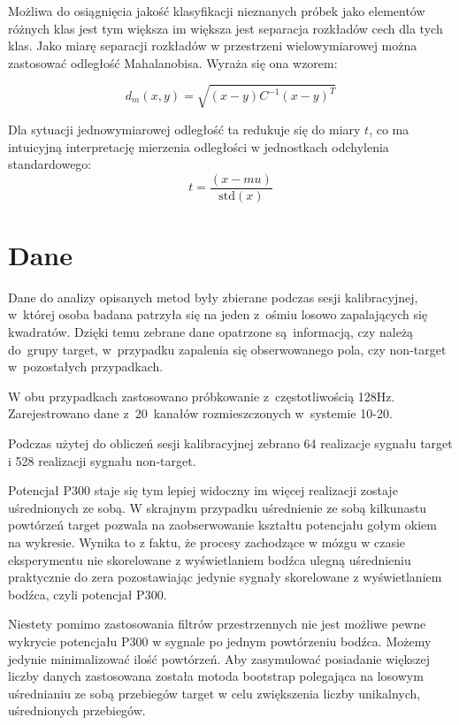 \documentclass[licencjacka,openright]{pracamgr}
\begin{document}
Możliwa do osiągnięcia jakość klasyfikacji nieznanych próbek jako elementów różnych klas jest tym większa im większa jest separacja rozkładów cech dla tych klas. Jako miarę separacji rozkładów w przestrzeni wielowymiarowej można zastosować odległość Mahalanobisa. Wyraża się ona wzorem:

\begin{equation}
d_{m}{(x,y)}=\sqrt{(x-y)C^{-1}(x-y)^T}
\end{equation}


Dla sytuacji jednowymiarowej odległość ta redukuje się do miary $t$, co ma intuicyjną interpretację mierzenia odległości w jednostkach odchylenia standardowego:
\begin{equation}
t = \frac{(x - mu)}{\mbox{std}(x)}
\end{equation}





\chapter{Dane}
Dane do analizy opisanych metod były zbierane podczas sesji kalibracyjnej, w~której osoba badana patrzyła się na jeden z~ośmiu losowo zapalających się kwadratów. Dzięki temu zebrane dane opatrzone są~informacją, czy należą do~grupy target, w~przypadku zapalenia się obserwowanego pola, czy non-target w~pozostałych przypadkach.

W obu przypadkach zastosowano próbkowanie z~częstotliwością 128Hz. Zarejestrowano dane z~20~kanałów rozmieszczonych w~systemie 10-20.

Podczas użytej do obliczeń sesji kalibracyjnej zebrano 64 realizacje sygnału target i 528 realizacji sygnału non-target.

Potencjał P300 staje się tym lepiej widoczny im więcej realizacji zostaje uśrednionych ze sobą. W skrajnym przypadku uśrednienie ze sobą kilkunastu powtórzeń target pozwala na zaobserwowanie kształtu potencjału gołym okiem na wykresie. Wynika to z faktu, że procesy zachodzące w mózgu w czasie eksperymentu nie skorelowane z wyświetlaniem bodźca ulegną uśrednieniu praktycznie do zera pozostawiając jedynie sygnały skorelowane z wyświetlaniem bodźca, czyli potencjał P300.

Niestety pomimo zastosowania filtrów przestrzennych nie jest możliwe pewne wykrycie potencjału P300 w sygnale po jednym powtórzeniu bodźca. Możemy jedynie minimalizować ilość powtórzeń. Aby zasymulować posiadanie większej liczby danych zastosowana została motoda bootstrap polegająca na losowym uśrednianiu ze sobą przebiegów target w celu zwiększenia liczby unikalnych, uśrednionych przebiegów.
\end{document}
